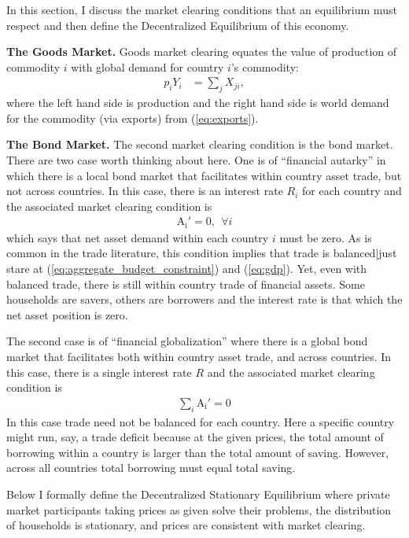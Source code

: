 \documentclass[12pt,pdftex]{article}
\begin{document}
\begin{onehalfspacing}
In this section, I discuss the market clearing conditions that an equilibrium must respect and then define the Decentralized Equilibrium of this economy.

\textbf{The Goods Market.} Goods market clearing equates the value of production of commodity $i$  with global demand for country $i$'s commodity:
\begin{align}
p_{i} Y_{i} &= \sum_{j}  X_{ji} \label{eq:goods-supply},
\end{align}
where the left hand side is production and the right hand side is world demand for the commodity (via exports) from (\ref{eq:exports}).

\textbf{The Bond Market.} The second market clearing condition is the bond market. There are two case worth thinking about here. One is of ``financial autarky'' in which there is a local bond market that facilitates within country asset trade, but not across countries. In this case, there is an interest rate $R_i$ for each country and the associated market clearing condition is
\begin{align}
\mathrm{A_i'} = 0, \ \ \forall i
\label{eq:bond-market-country}
\end{align}
which says that net asset demand within each country $i$ must be zero. As is common in the trade literature, this condition implies that trade is balanced|just stare at (\ref{eq:aggregate_budget_constraint}) and (\ref{eq:gdp}). Yet, even with balanced trade, there is still within country trade of financial assets. Some households are savers, others are borrowers and the interest rate is that which the net asset position is zero.

The second case is of ``financial globalization'' where there is a global bond market that facilitates both within country asset trade, and across countries. In this case, there is a single interest rate $R$ and the associated market clearing condition is
\begin{align}
\sum_{i}\mathrm{A_i'} = 0
\label{eq:bond-market-globalization}
\end{align}
In this case trade need not be balanced for each country. Here a specific country might run, say, a trade deficit because at the given prices, the total amount of borrowing within a country is larger than the total amount of saving. However, across all countries total borrowing must equal total saving.

Below I formally define the Decentralized Stationary Equilibrium where private market participants taking prices as given solve their problems, the distribution of households is stationary, and prices are consistent with market clearing.


\end{onehalfspacing}
\end{document}
